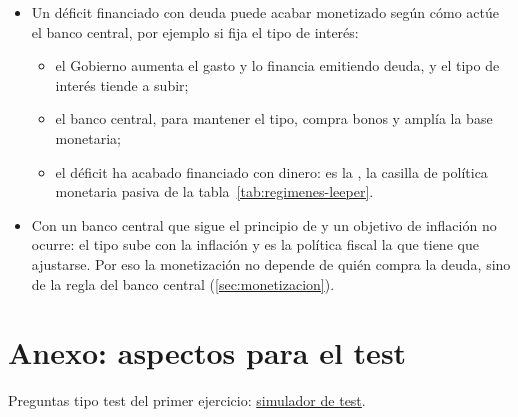 \documentclass[11pt]{article}
\begin{document}
\begin{itemize}
\item Un déficit financiado con deuda puede acabar monetizado según cómo actúe el banco central, por ejemplo si fija el tipo de interés:
  \begin{itemize}
  \item el Gobierno aumenta el gasto y lo financia emitiendo deuda, y el tipo de interés tiende a subir;
  \item el banco central, para mantener el tipo, compra bonos y amplía la base monetaria;
  \item el déficit ha acabado financiado con dinero: es la , la casilla de política monetaria pasiva de la tabla~\ref{tab:regimenes-leeper}.
  \end{itemize}
\item Con un banco central que sigue el principio de  y un objetivo de inflación no ocurre: el tipo sube con la inflación y es la política fiscal la que tiene que ajustarse. Por eso la monetización no depende de quién compra la deuda, sino de la regla del banco central (\ref{sec:monetizacion}).
\end{itemize}

\section{Anexo: aspectos para el test}\label{anexo:test}

\begin{anotaciones}
Preguntas tipo test del primer ejercicio: \href{https://www.victorgutierrezmarcos.es/oposicion/temario/primer-ejercicio/test/simulador.html?tema=3.A.39}{simulador de test}.
\end{anotaciones}
\end{document}
